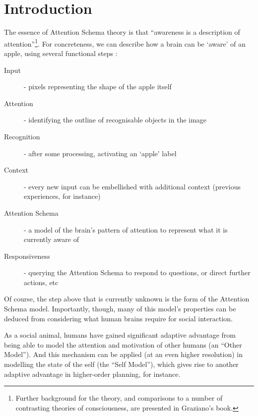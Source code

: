 \documentclass[citeauthoryear]{llncs}
\begin{document}
\section{Introduction}

The essence of Attention Schema theory is that ``awareness is a description of 
attention''\footnote{Further background for the theory, 
and comparisons to a number of contrasting theories of consciousness,
are presented in Graziano's \cite{graziano2013consciousness} book.}.
For concreteness, we can describe how a brain can be `aware' of an apple,
using several functional steps :

\begin{description}
\item[Input] - pixels representing the shape of the apple itself
\item[Attention] - identifying the outline of recognisable objects in the image 
\item[Recognition] - after some processing, activating an `apple' label
\item[Context] - every new input can be embellished with additional context (previous experiences, for instance)
\item[Attention Schema] - a model of the brain's pattern of attention to represent what it is currently aware of
\item[Responsiveness] - querying the Attention Schema to respond to questions, or direct further actions, etc
\end{description}

Of course, the step above that is currently unknown is the form of the Attention Schema model.  
Importantly, though, many of this model's properties can be deduced from considering 
what human brains require for social interaction.

As a social animal, humans have gained significant adaptive advantage from 
being able to model the attention and motivation of other humans (an ``Other Model'').  
%
And this mechanism can be applied (at an even higher resolution) in 
modelling the state of the self (the ``Self Model''), which gives rise to another adaptive advantage
in higher-order planning, for instance. 
%



\end{document}
